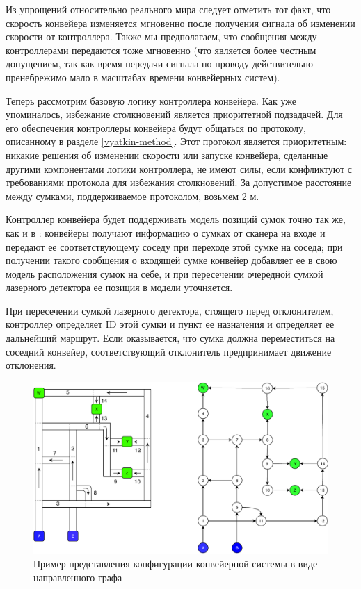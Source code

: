 \documentclass[specification,annotation,times]{itmo-student-thesis}
\theoremstyle{definition}
\begin{document}
Из упрощений относительно реального мира следует отметить тот факт, что скорость
конвейера изменяется мгновенно после получения сигнала об изменении скорости от
контроллера. Также мы предполагаем, что сообщения между контроллерами передаются
тоже мгновенно (что является более честным допущением, так как время передачи
сигнала по проводу действительно пренебрежимо мало в масштабах времени
конвейерных систем).

Теперь рассмотрим базовую логику контроллера конвейера. Как уже упоминалось,
избежание столкновений является приоритетной подзадачей. Для его обеспечения
контроллеры конвейера будут общаться по протоколу, описанному в
разделе \ref{vyatkin-method}. Этот протокол является приоритетным: никакие
решения об изменении скорости или запуске конвейера, сделанные другими
компонентами логики контроллера, не имеют силы, если конфликтуют с требованиями
протокола для избежания столкновений. За допустимое расстояние между сумками,
поддерживаемое протоколом, возьмем 2 м.

Контроллер конвейера будет поддерживать модель позиций сумок точно так же, как и
в \cite{black2009intelligent}: конвейеры получают информацию о сумках от сканера
на входе и передают ее соответствующему соседу при переходе этой сумке на
соседа; при получении такого сообщения о входящей сумке конвейер добавляет ее в свою
модель расположения сумок на себе, и при пересечении очередной сумкой лазерного
детектора ее позиция в модели уточняется.

При пересечении сумкой лазерного детектора, стоящего перед отклонителем,
контроллер определяет ID этой сумки и пункт ее назначения и определяет ее
дальнейший маршрут. Если оказывается, что сумка должна переместиться на соседний
конвейер, соответствующий отклонитель предпринимает движение отклонения.

\begin{figure}[!h]
  \caption{Пример представления конфигурации конвейерной системы в виде
    направленного графа}\label{conveyor-graph-representation}
  \centering
  \includegraphics[width=\textwidth]{conveyor-1-illustration-2}
\end{figure}
\end{document}
